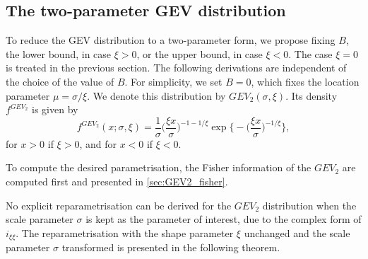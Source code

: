 \documentclass{article}
\newcommand{\1}{\mathds{1}}
\theoremstyle{definition}
\begin{document}

\subsection{The two-parameter GEV distribution}\label{sec:2-GEV}

To reduce the GEV distribution to a two-parameter form, we propose fixing $B$, the lower bound, in case $\xi >0$, or the upper bound, in case $\xi <0$. The case $\xi = 0$ is treated in the previous section. The following derivations are independent of the choice of the value of $B$. For simplicity, we set $B=0$, which fixes the location parameter $\mu = \sigma/\xi$. We denote this distribution by $GEV_2(\sigma,\xi)$. Its density $f^{GEV_{2}}$ is given by
\begin{equation*}
    f^{GEV_{2}}(x;\sigma,\xi) = \frac{1}{\sigma}\Big(\frac{\xi x}{\sigma}\Big)^{-1-1/\xi} \exp\Big\{-\Big(\frac{\xi x}{\sigma}\Big)^{-1/\xi}\Big\},
\end{equation*}
for $x> 0$ if $\xi >0$, and for $x<0$ if $\xi <0$.

To compute the desired parametrisation, the Fisher information of the $GEV_2$ are computed first and presented in \ref{sec:GEV2_fisher}.

No explicit reparametrisation can be derived for the $GEV_2$ distribution when the scale parameter $\sigma$ is kept as the parameter of interest, due to the complex form of $i_{\xi\xi}$. The reparametrisation with the shape parameter $\xi$ unchanged and the scale parameter $\sigma$ transformed is presented in the following theorem.
\end{document}
